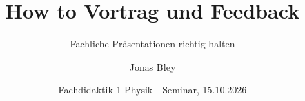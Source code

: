 \title[Vorträge und Feedback]{How to Vortrag und Feedback}
\subtitle{Fachliche Präsentationen richtig halten}
\author{Jonas Bley}
\date{Fachdidaktik 1 Physik - Seminar, 15.10.2026}
\titlegraphic{}
